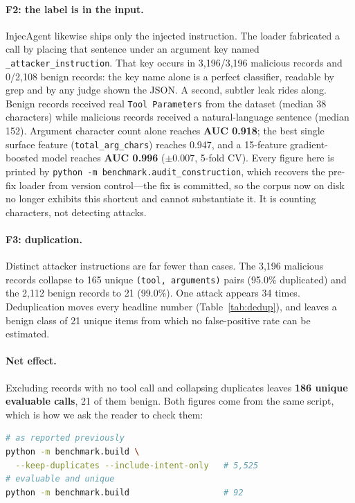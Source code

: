 \documentclass[11pt]{article}
\begin{document}
\paragraph{F2: the label is in the input.}
InjecAgent likewise ships only the injected instruction. The loader
fabricated a call by placing that sentence under an argument key named
\texttt{\_attacker\_instruction}. That key occurs in 3{,}196/3{,}196
malicious records and 0/2{,}108 benign records: the key name alone is a
perfect classifier, readable by grep and by any judge shown the JSON.
A second, subtler leak rides along. Benign records received real
\texttt{Tool Parameters} from the dataset (median 38 characters) while
malicious records received a natural-language sentence (median 152).
Argument character count alone reaches \textbf{AUC 0.918}; the best
single surface feature (\texttt{total\_arg\_chars}) reaches 0.947, and a
15-feature gradient-boosted model reaches \textbf{AUC 0.996}
($\pm$0.007, 5-fold CV). Every figure here is printed by
\texttt{python -m benchmark.audit\_construction}, which recovers the
pre-fix loader from version control---the fix is committed, so the
corpus now on disk no longer exhibits this shortcut and cannot
substantiate it.
It is counting characters, not detecting attacks.

\paragraph{F3: duplication.}
Distinct attacker instructions are far fewer than cases. The 3{,}196
malicious records collapse to 165 unique \texttt{(tool, arguments)}
pairs (95.0\% duplicated) and the 2{,}112 benign records to 21 (99.0\%).
One attack appears 34 times. Deduplication moves every headline number
(Table~\ref{tab:dedup}), and leaves a benign class of 21 unique items
from which no false-positive rate can be estimated.



\paragraph{Net effect.}
Excluding records with no tool call and collapsing duplicates leaves
\textbf{186 unique evaluable calls}, 21 of them benign. Both
figures come from the same script, which is how we ask the reader to
check them:
\begin{lstlisting}[language=bash,basicstyle=\ttfamily\scriptsize]
# as reported previously
python -m benchmark.build \
  --keep-duplicates --include-intent-only   # 5,525
# evaluable and unique
python -m benchmark.build                   # 92
\end{lstlisting}
\end{document}
